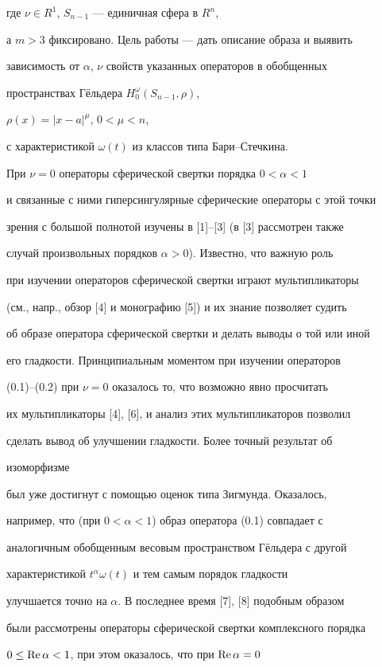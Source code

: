 где $\nu\in R^1$, $S_{n-1}$ --- единичная сфера в $R^n$,


а $m> 3$ фиксировано. Цель работы --- дать описание образа и выявить


зависимость от $\alpha$, $\nu$ свойств указанных операторов в обобщенных


пространствах Г\"ельдера $H_0^\omega (S_{n-1},\rho)$,


$\rho(x) = |x-a|^\mu$, $0 < \mu<n$,


с характеристикой $\omega (t)$ из классов типа Бари--Стечкина.


При $\nu =0$ операторы сферической свертки порядка $0 < \alpha < 1$


и связанные с ними гиперсингулярные сферические операторы с этой точки


зрения с большой полнотой изу\-че\-ны в [1]--[3] (в [3] рассмотрен также


случай произвольных порядков $\alpha > 0$). Известно, что важную роль


при изучении операторов сферической свертки играют мультипликаторы


(см., напр., обзор [4] и монографию [5]) и их знание позволяет судить


об образе оператора сферической свертки и делать выводы о той или иной


его гладкости. Принципиальным моментом при изучении операторов


(0.1)--(0.2) при $\nu =0$ оказалось то, что возможно явно просчитать


их мультипликаторы [4], [6], и анализ этих мультипликаторов позволил


сделать вывод об улучшении гладкости. Более точный результат об


изоморфизме


был уже достигнут с помощью оценок типа Зигмунда. Оказалось,


например, что (при $0<\alpha<1$) образ оператора (0.1) совпадает с


аналогичным обобщенным весовым пространством Г\"ельдера с другой


характеристикой $t^\alpha \omega (t)$ и тем самым порядок гладкости


улучшается точно на $\alpha$. В последнее время [7], [8] подобным образом


были рассмотрены операторы сферической свертки комплексного порядка


$0 \le \operatorname{Re} \alpha < 1$, при этом оказалось, что при $\operatorname{Re} \alpha = 0$


